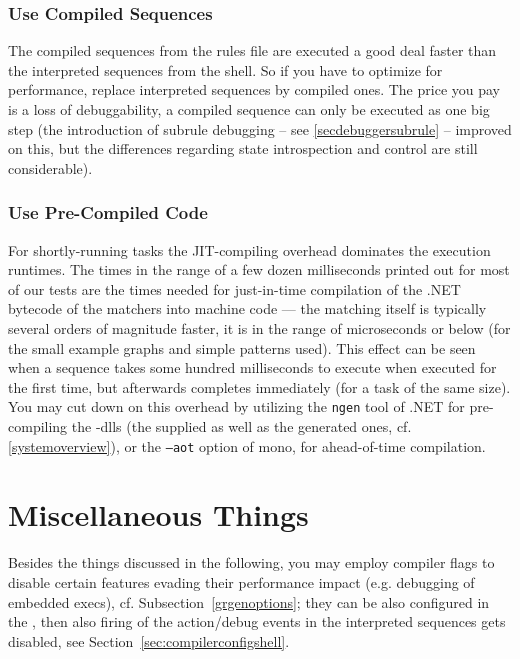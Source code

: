 \subsubsection*{Use Compiled Sequences}
The compiled sequences from the rules file are executed a good deal faster than the interpreted sequences from the shell.
So if you have to optimize for performance, replace interpreted sequences by compiled ones.
The price you pay is a loss of debuggability, a compiled sequence can only be executed as one big step 
(the introduction of subrule debugging -- see \ref{secdebuggersubrule} -- improved on this, but the differences regarding state introspection and control are still considerable).

\subsubsection*{Use Pre-Compiled Code}
For shortly-running tasks the JIT-compiling overhead dominates the execution runtimes.
The times in the range of a few dozen milliseconds printed out for most of our tests are the times needed for just-in-time compilation of the .NET bytecode of the matchers into machine code --- the matching itself is typically several orders of magnitude faster, it is in the range of microseconds or below (for the small example graphs and simple patterns used).
This effect can be seen when a sequence takes some hundred milliseconds to execute when executed for the first time, but afterwards completes immediately (for a task of the same size).
You may cut down on this overhead by utilizing the \texttt{ngen} tool of .NET for pre-compiling the \GrG-dlls (the supplied as well as the generated ones, cf. \ref{systemoverview}), or the \texttt{--aot} option of mono, for ahead-of-time compilation.


\section{Miscellaneous Things}

Besides the things discussed in the following, you may employ compiler flags to disable certain features evading their performance impact (e.g. debugging of embedded execs), cf. Subsection~\ref{grgenoptions}; they can be also configured in the \GrShell{}, then also firing of the action/debug events in the interpreted sequences gets disabled, see Section~\ref{sec:compilerconfigshell}. 

